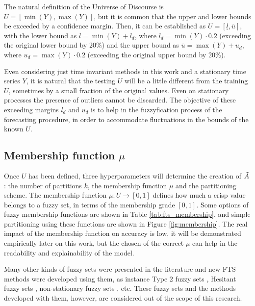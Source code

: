 The natural definition of the Universe of Discourse is $U = [\min(Y),\max(Y)]$, but it is common that the upper and lower bounds be exceeded by a confidence margin. Then, it can be established as $U = [\underline{l}, \overline{u}]$, with the lower bound as $\underline{l} = \min(Y) + l_d$, where $l_d = \min(Y)\cdot 0.2$ (exceeding the original lower bound by 20\%) and the upper bound as $\overline{u} = \max(Y) + u_d$, where $u_d = \max(Y)\cdot 0.2$ (exceeding the original upper bound by 20\%). 

Even considering just time invariant methods in this work and a stationary time series $Y$, it is natural that the testing $U$ will be a little different from the training $U$, sometimes by a small fraction of the original values. Even on stationary processes the presence of outliers cannot be discarded. The objective of these exceeding margins $l_d$ and $u_d$ is to help in the fuzzyfication process of the forecasting procedure, in order to accommodate fluctuations in the bounds of the known $U$.

%
\subsection{Membership function $\mu$}
\label{sec:fts_membership}

Once $U$ has been defined, three hyperparameters will determine the creation of $\tilde{A}$: the number of partitions $k$, the membership function $\mu$ and the partitioning scheme. The membership function $\mu: U \rightarrow [0,1]$ defines how much a crisp value belongs to a fuzzy set, in terms of the membership grade $[0,1]$. Some options of fuzzy membership functions are shown in Table \ref{tab:fts_membership}, and simple partitioning using these functions are shown in Figure \ref{fig:membership}. The real impact of the membership function on accuracy is low, it will be demonstrated empirically later on this work, but the chosen of the correct $\mu$ can help in the readability and explainability of the model.

Many other kinds of fuzzy sets were presented in the literature and new FTS methods were developed using them, as instance Type 2 fuzzy sets \citep{huarng2005type, Bajestani2011}, Hesitant fuzzy sets \citep{Bisht2016}, non-stationary fuzzy sets \citep{Alves2018}, etc. These fuzzy sets and the methods developed with them, however, are considered out of the scope of this research.

